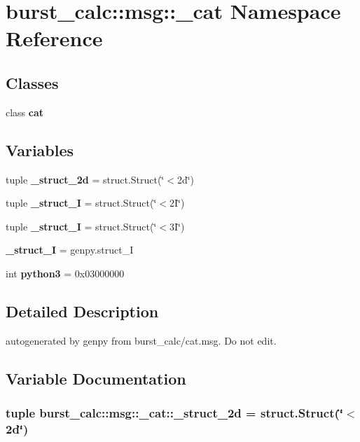 \section{burst\-\_\-calc\-:\-:msg\-:\-:\-\_\-cat \-Namespace \-Reference}
\label{namespaceburst__calc_1_1msg_1_1__cat}
\subsection*{\-Classes}
\begin{DoxyCompactItemize}
\item 
class {\bf cat}
\end{DoxyCompactItemize}
\subsection*{\-Variables}
\begin{DoxyCompactItemize}
\item 
tuple {\bf \-\_\-struct\-\_\-2d} = struct.\-Struct(\char`\"{}$<$2d\char`\"{})
\item 
tuple {\bf \-\_\-struct\-\_\-I} = struct.\-Struct(\char`\"{}$<$2\-I\char`\"{})
\item 
tuple {\bf \-\_\-struct\-\_\-I} = struct.\-Struct(\char`\"{}$<$3\-I\char`\"{})
\item 
{\bf \-\_\-struct\-\_\-\-I} = genpy.\-struct\-\_\-\-I
\item 
int {\bf python3} = 0x03000000
\end{DoxyCompactItemize}


\subsection{\-Detailed \-Description}
\begin{DoxyVerb}autogenerated by genpy from burst_calc/cat.msg. Do not edit.\end{DoxyVerb}
 

\subsection{\-Variable \-Documentation}
\subsubsection[{\-\_\-struct\-\_\-2d}]{\setlength{\rightskip}{0pt plus 5cm}tuple {\bf burst\-\_\-calc\-::msg\-::\-\_\-cat\-::\-\_\-struct\-\_\-2d} = struct.\-Struct(\char`\"{}$<$2d\char`\"{})}\label{namespaceburst__calc_1_1msg_1_1__cat_a62646719e086618d210612f507b4522e}


